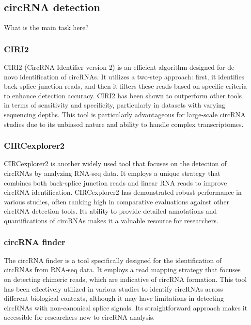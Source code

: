 \subsection{circRNA detection}
What is the main task here?

\subsubsection{CIRI2}
CIRI2 (CircRNA Identifier version 2) is an efficient algorithm designed for de
novo identification of circRNAs. It utilizes a two-step approach: first, it
identifies back-splice junction reads, and then it filters these reads based on
specific criteria to enhance detection accuracy. CIRI2 has been shown to
outperform other tools in terms of sensitivity and specificity, particularly in
datasets with varying sequencing depths\supercite{gao_ciri_2015,zheng_reconstruction_2019}.
This tool is particularly advantageous for large-scale circRNA studies due to
its unbiased nature and ability to handle complex transcriptomes\supercite{chuang_assessing_2023}.

\subsubsection{CIRCexplorer2}
CIRCexplorer2 is another widely used tool that focuses on the detection of
circRNAs by analyzing RNA-seq data. It employs a unique strategy that combines
both back-splice junction reads and linear RNA reads to improve circRNA
identification. CIRCexplorer2 has demonstrated robust performance in various
studies, often ranking high in comparative evaluations against other circRNA
detection tools\supercite{zeng_comprehensive_2017,nicolet_circular_2018}. Its ability to
provide detailed annotations and quantifications of circRNAs makes it a valuable
resource for researchers\supercite{hansen_comparison_2016}.

\subsubsection{circRNA finder}
The circRNA finder is a tool specifically designed for the identification of
circRNAs from RNA-seq data. It employs a read mapping strategy that focuses on
detecting chimeric reads, which are indicative of circRNA formation. This tool
has been effectively utilized in various studies to identify circRNAs across
different biological contexts, although it may have limitations in detecting
circRNAs with non-canonical splice
signals\supercite{sekar_circular_2018,liu_prkra_2022}. Its straightforward
approach makes it accessible for researchers new to
circRNA analysis.

